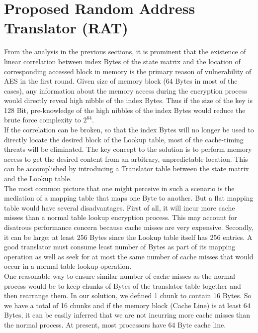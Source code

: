 \section{Proposed Random Address Translator (RAT)}

From the analysis in the previous sections, it is prominent that the existence of linear correlation between index Bytes of the state matrix and the location of corresponding accessed block in memory is the primary reason of vulnerability of AES in the first round. Given size of memory block (64 Bytes in most of the cases), any information about the memory access during the encryption process would directly reveal high nibble of the index Bytes. Thus if the size of the key is 128 Bit, pre-knowledge of the high nibbles of the index Bytes would reduce the brute force complexity to $2^{64}$.\\

If the correlation can be broken, so that the index Bytes will no longer be used to directly locate the desired block of the Lookup table, most of the cache-timing threats will be eliminated. The key concept to the solution is to perform memory access to get the desired content from an arbitrary, unpredictable location. This can be accomplished by introducing a Translator table between the state matrix and the Lookup table.\\

The most common picture that one might perceive in such a scenario is the mediation of a mapping table that maps one Byte to another. But a flat mapping table would have several disadvantages. First of all, it will incur more cache misses than a normal table lookup encryption process. This may account for disatrous performance concern because cache misses are very expensive. Secondly, it can be large; at least 256 Bytes since the Lookup table itself has 256 entries. A good translator must consume least number of Bytes as part of its mapping operation as well as seek for at most the same number of cache misses that would occur in a normal table lookup operation.\\

One reasonable way to ensure similar number of cache misses as the normal process would be to keep chunks of Bytes of the translator table together and then rearrange them. In our solution, we defined 1 chunk to contain 16 Bytes. So we have a total of 16 chunks and if the memory block (Cache Line) is at least 64 Bytes, it can be easily inferred that we are not incurring more cache misses than the normal process. At present, most processors have 64 Byte cache line.\\

